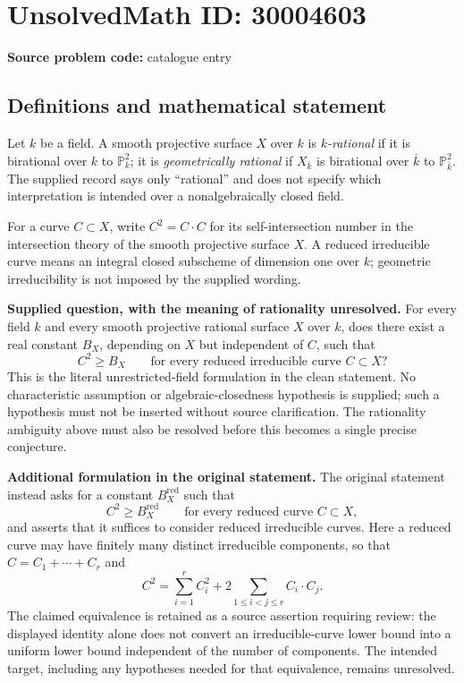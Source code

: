\documentclass[11pt]{article}
\newcommand{\PP}{\mathbb{P}}
\begin{document}
\section*{UnsolvedMath ID: 30004603}
\textbf{Source problem code:} catalogue entry
\subsection{Definitions and mathematical statement}
Let \(k\) be a field. A smooth projective surface \(X\) over \(k\) is \emph{\(k\)-rational} if it is birational over \(k\) to \(\PP^2_k\); it is \emph{geometrically rational} if \(X_{\overline{k}}\) is birational over \(\overline{k}\) to \(\PP^2_{\overline{k}}\). The supplied record says only ``rational'' and does not specify which interpretation is intended over a nonalgebraically closed field.

For a curve \(C\subset X\), write \(C^2=C\cdot C\) for its self-intersection number in the intersection theory of the smooth projective surface \(X\). A reduced irreducible curve means an integral closed subscheme of dimension one over \(k\); geometric irreducibility is not imposed by the supplied wording.

\textbf{Supplied question, with the meaning of rationality unresolved.} For every field \(k\) and every smooth projective rational surface \(X\) over \(k\), does there exist a real constant \(B_X\), depending on \(X\) but independent of \(C\), such that
\[
 C^2\geq B_X
 \qquad\text{for every reduced irreducible curve }C\subset X?
\]
This is the literal unrestricted-field formulation in the clean statement. No characteristic assumption or algebraic-closedness hypothesis is supplied; such a hypothesis must not be inserted without source clarification. The rationality ambiguity above must also be resolved before this becomes a single precise conjecture.

\textbf{Additional formulation in the original statement.} The original statement instead asks for a constant \(B_X^{\mathrm{red}}\) such that
\[
 C^2\geq B_X^{\mathrm{red}}
 \qquad\text{for every reduced curve }C\subset X,
\]
and asserts that it suffices to consider reduced irreducible curves. Here a reduced curve may have finitely many distinct irreducible components, so that \(C=C_1+\cdots+C_r\) and
\[
 C^2=\sum_{i=1}^{r}C_i^2+2\sum_{1\leq i<j\leq r}C_i\cdot C_j.
\]
The claimed equivalence is retained as a source assertion requiring review: the displayed identity alone does not convert an irreducible-curve lower bound into a uniform lower bound independent of the number of components. The intended target, including any hypotheses needed for that equivalence, remains unresolved.
\end{document}
